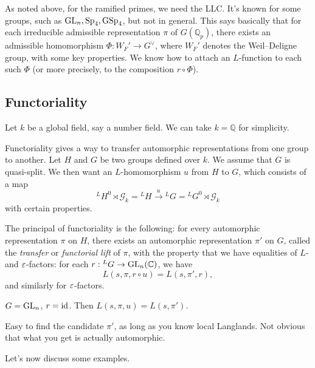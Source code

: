 \documentclass[reqno]{amsart} 
\begin{document}
As noted above, for the ramified primes, we need the LLC.  It's known for some groups, such as $\operatorname{GL}_n, \operatorname{Sp}_4, \operatorname{GSp}_4$, but not in general.  This says basically that for each irreducible admissible representation $\pi$ of $G(\mathbb{Q}_p)$, there exists an admissible homomorphism $\Phi : W_F' \rightarrow G^\vee$, where $W_F'$ denotes the Weil--Deligne group, with some key properties.  We know how to attach an $L$-function to each such $\Phi$ (or more precisely, to the composition $r \circ \Phi$).

\subsection{Functoriality}
Let $k$ be a global field, say a number field.  We can take $k = \mathbb{Q}$ for simplicity.

Functoriality gives a way to transfer automorphic representations from one group to another.  Let $H$ and $G$ be two groups defined over $k$.  We assume that $G$ is quasi-split.  We then want an $L$-homomorphism $u$ from $H$ to $G$, which consists of a map
\begin{equation*}
 {}^L H^0 \rtimes \mathcal{G}_k = {}^L H
 \xrightarrow{u} {}^L G = {}^L G^0 \rtimes \mathcal{G}_k
\end{equation*}
with certain properties.

The principal of functoriality is the following: for every automorphic representation $\pi$ on $H$, there exists an automorphic representation $\pi '$ on $G$, called the \emph{transfer} or \emph{functorial lift} of $\pi$, with the property that we have equalities of $L$- and $\varepsilon$-factors: for each $r : {}^L G \rightarrow \operatorname{GL}_n(\mathbb{C})$, we have
\begin{equation*}
  L(s, \pi , r \circ u)
  =
  L(s, \pi' , r),
\end{equation*}
and similarly for $\varepsilon$-factors.

\begin{example}
  $G = \operatorname{GL}_n$, $r = \operatorname{id}$.  Then $L(s, \pi, u) = L(s, \pi ')$.
\end{example}

\begin{remark}
  Easy to find the candidate $\pi '$, as long as you know local Langlands.  Not obvious that what you get is actually automorphic.
\end{remark}

Let's now discuss some examples.
\end{document}
